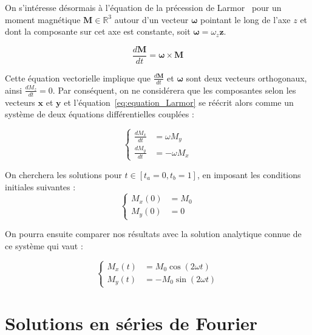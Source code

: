 \documentclass[12pt]{report}
\begin{document}
On s'intéresse désormais à l'équation de la précession de Larmor~\cite{PrecessionLarmor} pour un moment magnétique $\bm{M} \in \mathbb{R}^3$ autour d'un vecteur ${\bm{\omega}}$ pointant le long de l'axe $z$ et dont la composante sur cet axe est constante, soit $\bm{\omega}=\omega_z{\bm z}$.

\begin{equation}
    \frac{d\bm{M}}{dt} = \bm{\omega}\times\bm{M}
    \label{eq:equation_Larmor}
\end{equation}

Cette équation vectorielle implique que $\frac{d\bm{M}}{dt} $ et $\bm{\omega}$ sont deux vecteurs orthogonaux, ainsi $\frac{dM_z}{dt}=0$.
Par conséquent, on ne considérera que les composantes selon les vecteurs $\bm{x}$ et $\bm{y}$ et l'équation~\ref{eq:equation_Larmor} se réécrit alors comme un système de deux équations différentielles couplées :

\begin{equation}
    \left\{
    \begin{aligned}
        \frac{dM_x}{dt} & = \omega M_y  \\
        \frac{dM_y}{dt} & = -\omega M_x
    \end{aligned}
    \right.
\end{equation}

On cherchera les solutions pour $t\in [t_a=0,t_b=1]$, en imposant les conditions initiales suivantes :
\begin{equation}
    \left\{
    \begin{aligned}
        M_x(0) & = M_0 \\
        M_y(0) & = 0
    \end{aligned}
    \right.
    \label{eq:equations_couplees}
\end{equation}

On pourra ensuite comparer nos résultats avec la solution analytique connue de ce système qui vaut :

\begin{equation}
    \left\{
    \begin{aligned}
        M_x(t) & =  M_0 \cos(2\omega t) \\
        M_y(t) & = -M_0 \sin(2\omega t)
    \end{aligned}
    \right.
    \label{eq:solution_analytique_couplee}
\end{equation}

\section{Solutions en séries de Fourier}
\label{sec:sol_series_fourier_2D}
\end{document}
